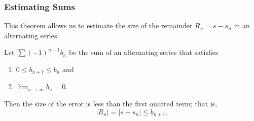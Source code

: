 \begin{frame}
\frametitle{Estimating Sums}
This theorem allows us to estimate the size of the remainder $R_n = s - s_n$ in an alternating series.
\begin{theorem}
Let $\displaystyle \sum (-1)^{n-1} b_n$ be the sum of an alternating series that satisfies
\begin{enumerate}
\item  $0\leq b_{n+1}\leq b_n$ and
\item  $\displaystyle \lim_{n\to\infty} b_n = 0$.
\end{enumerate}
Then the size of the error is less than the first omitted term; that is,
\[
|R_n| = |s - s_n| \leq b_{n+1}.
\]
\end{theorem}
\end{frame}
